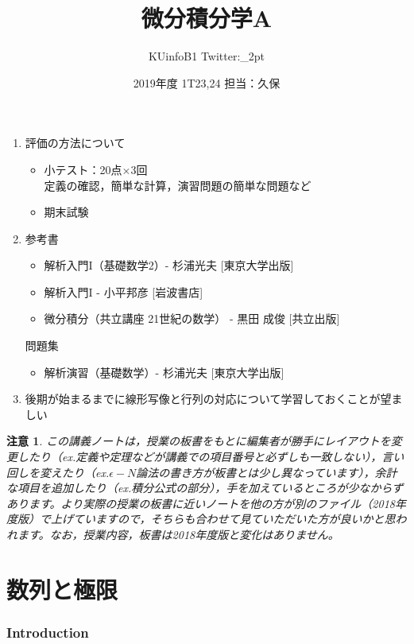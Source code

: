 \documentclass[dvipdfmx,a4j,10pt]{jsarticle}
\title{微分積分学A}
\author{KUinfoB1 Twitter:\_2pt}
\author{2019年度 1T23,24 担当：久保}
\date{}
\theoremstyle{mystyle1}
\theoremstyle{mystyle2}
\newtheorem{note}{注意}
\begin{document}
\maketitle
\begin{enumerate}
\item 評価の方法について
	\begin{itemize}
		\item 小テスト：20点$\times$3回\\
			定義の確認，簡単な計算，演習問題の簡単な問題など
		\item 期末試験
	\end{itemize}
\item 参考書
	\begin{itemize}
		\item 解析入門I（基礎数学2）- 杉浦光夫 [東京大学出版]
		\item 解析入門I - 小平邦彦 [岩波書店]
		\item 微分積分（共立講座 21世紀の数学） - 黒田 成俊 [共立出版]
	\end{itemize}
	問題集
		\begin{itemize}
		\item 解析演習（基礎数学）- 杉浦光夫 [東京大学出版]
	\end{itemize}
\item 後期が始まるまでに線形写像と行列の対応について学習しておくことが望ましい
\end{enumerate}

\begin{note}
	この講義ノートは，授業の板書をもとに編集者が勝手にレイアウトを変更したり（ex.定義や定理などが講義での項目番号と必ずしも一致しない），言い回しを変えたり（ex.$\epsilon-N$論法の書き方が板書とは少し異なっています），余計な項目を追加したり（ex.積分公式の部分），手を加えているところが少なからずあります。より実際の授業の板書に近いノートを他の方が別のファイル（2018年度版）で上げていますので，そちらも合わせて見ていただいた方が良いかと思われます。なお，授業内容，板書は2018年度版と変化はありません。
\end{note}

\newpage

\tableofcontents

\newpage

\part{数列と極限}
\section{Introduction}
\end{document}
